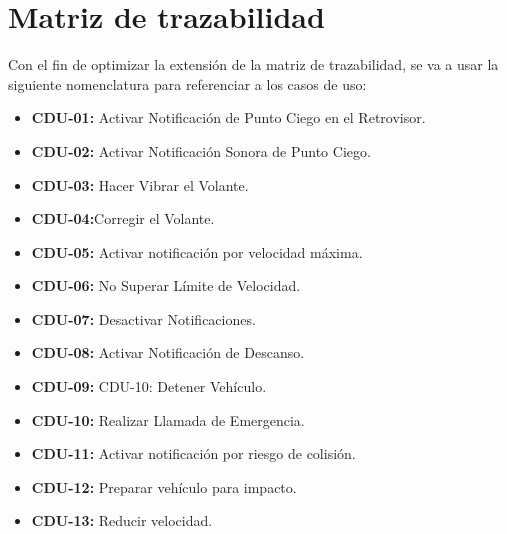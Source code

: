 \section{Matriz de trazabilidad}
\par Con el fin de optimizar la extensión de la matriz de trazabilidad, se va a usar la siguiente nomenclatura para referenciar a los casos de uso:

\begin{itemize}[-]
\item \textbf{CDU-01:} Activar Notificación de Punto Ciego en el Retrovisor.
\item \textbf{CDU-02:} Activar Notificación Sonora de Punto Ciego.
\item \textbf{CDU-03:} Hacer Vibrar el Volante.
\item \textbf{CDU-04:}Corregir el Volante.
\item \textbf{CDU-05:} Activar notificación por velocidad máxima.
\item \textbf{CDU-06:} No Superar Límite de Velocidad.
\item \textbf{CDU-07:} Desactivar Notificaciones.
\item \textbf{CDU-08:} Activar Notificación de Descanso.
\item \textbf{CDU-09:} CDU-10: Detener Vehículo.
\item \textbf{CDU-10:} Realizar Llamada de Emergencia.
\item \textbf{CDU-11:} Activar notificación por riesgo de colisión.
\item \textbf{CDU-12:} Preparar vehículo para impacto.
\item \textbf{CDU-13:} Reducir velocidad.
\end{itemize}

